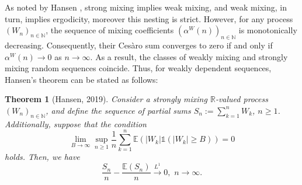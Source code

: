 \documentclass[a4paper,10pt]{article}
\newtheorem{theorem}{Theorem}[section]
\newcommand{\N}{\mathbb{N}}
\newcommand{\R}{\mathbb{R}}
\newcommand{\E}{\mathbb{E}}
\newcommand{\ind}{\mathds{1}}
\begin{document}
As noted by Hansen \cite{hansen2019weak}, strong mixing implies weak mixing, and weak mixing, in turn, implies ergodicity, moreover this nesting is strict. However, for any process $(W_n)_{n\in\N}$, the sequence of mixing coefficients $(\alpha^W(n))_{n\in\N}$ is monotonically decreasing. Consequently, their Ces\`{a}ro sum converges to zero if and only if $\alpha^W(n) \to 0$ as $n \to \infty$. As a result, the classes of weakly mixing and strongly mixing random sequences coincide. Thus, for weakly dependent sequences, Hansen's theorem can be stated as follows:
\begin{theorem}[Hansen, 2019]\label{thm:Hansen}
	Consider a strongly mixing $\R$-valued process $(W_n)_{n\in\N}$, and define the sequence of partial sums $S_n:=\sum_{k=1}^{n} W_k$, $n\ge 1$. Additionally, suppose that the condition
	\begin{equation}\label{eq:uint}
		\lim_{B\to\infty}\sup_{n\ge 1}\frac{1}{n}\sum_{k=1}^{n}
		\E (|W_k|\ind (|W_k|\ge B)) = 0
	\end{equation}
	holds.
	Then, we have 
	$$
	\frac{S_n}{n}-\frac{\E (S_n)}{n}\stackrel{L^1}{\to} 0,\,\,n\to\infty.
	$$
\end{theorem}
\end{document}
